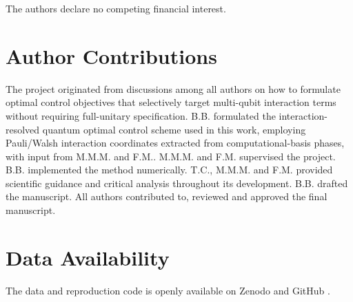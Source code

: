\noindent
The authors declare no competing financial interest.


\section*{Author Contributions}
\noindent
The project originated from discussions among all authors on how to formulate optimal control objectives that selectively target multi-qubit interaction terms without requiring full-unitary specification. B.B. formulated the interaction-resolved quantum optimal control scheme used in this work, employing Pauli/Walsh interaction coordinates extracted from computational-basis phases, with input from M.M.M. and F.M.. M.M.M. and F.M. supervised the project. B.B. implemented the method numerically. T.C., M.M.M. and F.M. provided scientific guidance and critical analysis throughout its development. B.B. drafted the manuscript. All authors contributed to, reviewed and approved the final manuscript.



\section*{Data Availability}
\noindent
The data and reproduction code is openly available on Zenodo and GitHub \cite{baran2026_multiqubit_control}.


